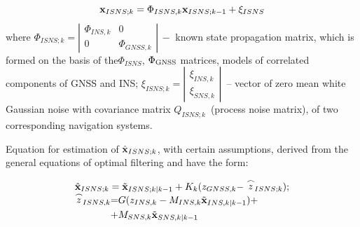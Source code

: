 \documentclass[conference, utf8]{IEEEtran}
\begin{document}
\begin{equation}
{\bf x}_{ISNS;k} =\Phi_{ISNS,k} {\bf x}_{ISNS;k-1} +\xi _{ISNS} 
\label{eq:state_prop}
\end{equation}
where  $\Phi_{ISNS;k} =\left|\begin{array}{cc} {\Phi_{INS,k} } & {0} \\ {0} & {\Phi_{GNSS,k} } \end{array}\right|\, -$ known 
state propagation matrix, which is formed on the basis of the$\Phi_{ISNS} $, $\Phi_{{\rm GNSS}} $ matrices, models 
of correlated components of GNSS and INS; 
$\xi _{ISNS;k} =\left|\begin{array}{c} {\xi _{INS,k} } \\ {\xi _{SNS,k} } \end{array}\right|\,$  -- vector 
of zero mean white Gaussian noise with covariance matrix $Q_{ISNS;k} \, $ (process noise matrix), of two corresponding navigation systems. 

Equation for estimation of $\hat{{\bf x}}_{ISNS;k} $, with certain assumptions, derived 
from the general equations of optimal filtering and have the form:

\begin{equation} 
  \begin{array}{l} 
  {\hat{{\bf x}}_{ISNS;k} =\tilde{{\bf x}}_{ISNS;k|k-1} +K_{k} (z_{GNSS,k} -\stackrel{\frown}{z}_{ISNS;k} );} \\ 
    {\begin{split}
    \stackrel{\frown}{z}_{ISNS,k} = & G(z_{INS,k} -M_{INS,k} \tilde{{\bf x}}_{INS,k|k-1} )+ \\
				  +   & M_{SNS,k} \tilde{{\bf x}}_{SNS,k|k-1} 
    \end{split}}
  \end{array} 
  \label{eq:k1} 
\end{equation} 
\end{document}
